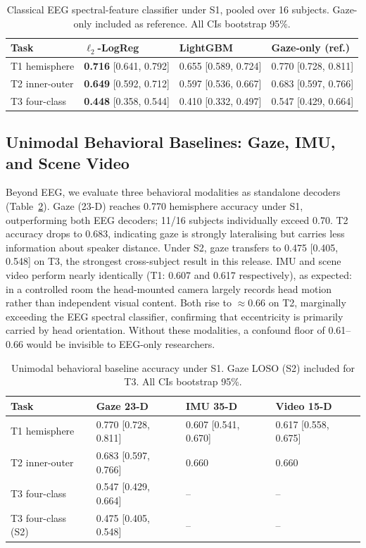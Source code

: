\documentclass{article}
\begin{document}
\begin{table}[ht]
\centering
\small
\caption{Classical EEG spectral-feature classifier under S1, pooled over 16
subjects. Gaze-only included as reference. All CIs bootstrap 95\%.}
\label{tab:spectral}
\begin{tabular}{llll}
\toprule
Task & $\ell_2$-LogReg & LightGBM & Gaze-only (ref.) \\
\midrule
T1 hemisphere  & \textbf{0.716} [0.641, 0.792] & 0.655 [0.589, 0.724] & 0.770 [0.728, 0.811] \\
T2 inner-outer & \textbf{0.649} [0.592, 0.712] & 0.597 [0.536, 0.667] & 0.683 [0.597, 0.766] \\
T3 four-class  & \textbf{0.448} [0.358, 0.544] & 0.410 [0.332, 0.497] & 0.547 [0.429, 0.664] \\
\bottomrule
\end{tabular}
\end{table}

\subsection{Unimodal Behavioral Baselines: Gaze, IMU, and Scene Video}
\label{sec:behav-base}

Beyond EEG, we evaluate three behavioral modalities as standalone decoders
(Table~\ref{tab:unimodal}). Gaze (23-D) reaches 0.770 hemisphere accuracy
under S1, outperforming both EEG decoders; 11/16 subjects individually exceed
0.70. T2 accuracy drops to 0.683, indicating gaze is strongly lateralising
but carries less information about speaker distance. Under S2, gaze transfers
to 0.475 [0.405, 0.548] on T3, the strongest cross-subject result in this
release. IMU and scene video perform nearly identically (T1: 0.607 and 0.617
respectively), as expected: in a controlled room the head-mounted camera
largely records head motion rather than independent visual content. Both rise
to $\approx$0.66 on T2, marginally exceeding the EEG spectral classifier,
confirming that eccentricity is primarily carried by head orientation. Without
these modalities, a confound floor of 0.61--0.66 would be invisible to
EEG-only researchers.

\begin{table}[ht]
\centering
\small
\caption{Unimodal behavioral baseline accuracy under S1. Gaze LOSO (S2)
included for T3. All CIs bootstrap 95\%.}
\label{tab:unimodal}
\begin{tabular}{llll}
\toprule
Task & Gaze 23-D & IMU 35-D & Video 15-D \\
\midrule
T1 hemisphere      & 0.770 [0.728, 0.811] & 0.607 [0.541, 0.670] & 0.617 [0.558, 0.675] \\
T2 inner-outer     & 0.683 [0.597, 0.766] & 0.660 & 0.660 \\
T3 four-class      & 0.547 [0.429, 0.664] & -- & -- \\
T3 four-class (S2) & 0.475 [0.405, 0.548] & -- & -- \\
\bottomrule
\end{tabular}
\end{table}
\end{document}
